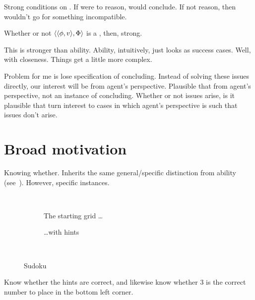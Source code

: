 {
  \color{red}
  Strong conditions on .
  If were to reason, would conclude.
  If not reason, then wouldn't go for something incompatible.

  Whether or not \(\langle \langle \phi, v \rangle, \Phi \rangle\) is a \fc{}, then, strong.

  This is stronger than ability.
  Ability, intuitively, just looks as success cases.
  Well, with closeness.
  Things get a little more complex.

  Problem for me is lose specification of concluding.
  Instead of solving these issues directly, our interest will be from agent's perspective.
  Plausible that from agent's perspective, not an instance of concluding.
  Whether or not issues arise, is it plausible that turn interest to cases in which agent's perspective is such that issues don't arise.
}

\section{Broad motivation}
\label{cha:fcs:sec:broad-motivation}

\begin{note}
  Knowing whether.
  Inherits the same general/specific distinction from ability (see~).
  However, specific instances.
\end{note}

\begin{note}
  \begin{illustration}[Sudoku]
    \label{illu:gist:sudoku}
    \begin{figure}[H]
      \mbox{ }\hfill
      \begin{subfigure}{0.45\linewidth}
        \centering
        \sudokuGrid{}
        \caption{The starting grid \dots}
        \label{fig:sudoku:grid}
      \end{subfigure}
      \hfill
      \begin{subfigure}{0.45\linewidth}
        \centering
        \sudokuGridHints{}
        \caption{\dots with hints}
        \label{fig:sudoku:hint}
      \end{subfigure}
      \hfill\mbox{ }
      \caption{Sudoku}
      \label{fig:sudoku}
    \end{figure}
    Know whether the hints are correct, and likewise know whether 3 is the correct number to place in the bottom left corner.
  \end{illustration}
\end{note}

